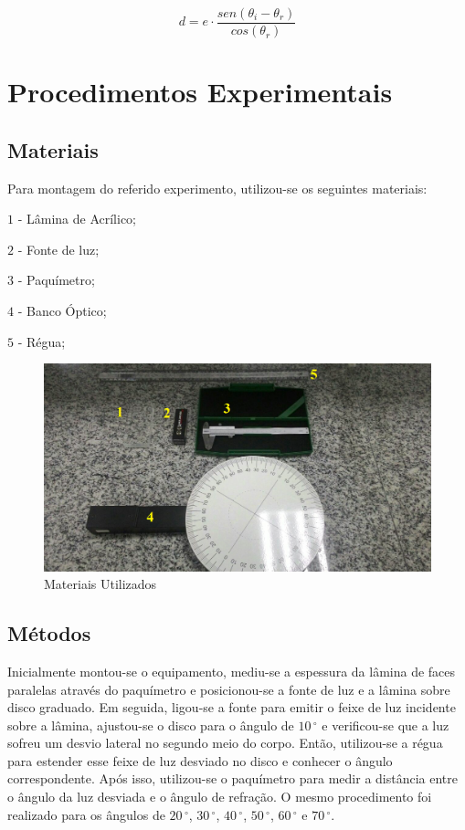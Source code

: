 \documentclass[
	12pt,				%
	oneside,			%
	a4paper,			%
	english,			%
	french,				%
	spanish,			%
	brazil				%
	]{abntex2}
\begin{document}
$$d = e \cdot \dfrac{sen(\theta_i - \theta_r)}{cos(\theta_r)}$$


\chapter{Procedimentos Experimentais}
\section{Materiais}

Para montagem do referido experimento, utilizou-se os seguintes materiais:

$1$ - Lâmina de Acrílico;

$2$ - Fonte de luz;

$3$ - Paquímetro;

$4$ - Banco Óptico; 

$5$ - Régua; 


\begin{figure}[htb]
	\centering
	\includegraphics[scale=0.3]{materiais.png}
	\caption{Materiais Utilizados}
	\label{figura-materiais}
\end{figure}

\section{Métodos}

Inicialmente montou-se o equipamento, mediu-se a espessura da lâmina de faces paralelas através do paquímetro e posicionou-se a fonte de luz e a lâmina sobre disco graduado. Em seguida, ligou-se a fonte para emitir o feixe de luz incidente sobre a lâmina, ajustou-se o disco para o ângulo de $10\,^{\circ}$ e verificou-se que a luz sofreu um desvio lateral no segundo meio do corpo. Então, utilizou-se a régua para estender esse feixe de luz desviado no disco e conhecer o ângulo correspondente. Após isso, utilizou-se o paquímetro para medir a distância entre o ângulo da luz desviada e o ângulo de refração. O mesmo procedimento foi realizado para os ângulos de $20\,^{\circ}$, $30\,^{\circ}$, $40\,^{\circ}$, $50\,^{\circ}$, $60\,^{\circ}$ e $70\,^{\circ}$.
\end{document}
